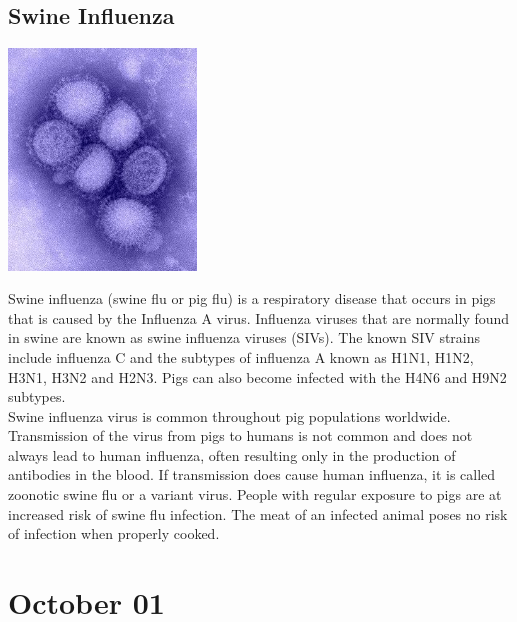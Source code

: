 \documentclass[11pt]{report}
\begin{document}
\subsection{Swine Influenza}
\vspace{2mm}\begin{center}\includegraphics[width=5cm]{./img/h1N1.jpg}\end{center}
Swine influenza (swine flu or pig flu) is a respiratory disease that occurs in pigs that is caused by the Influenza A virus. Influenza viruses that are normally found in swine are known as swine influenza viruses (SIVs). The known SIV strains include influenza C and the subtypes of influenza A known as H1N1, H1N2, H3N1, H3N2 and H2N3. Pigs can also become infected with the H4N6 and H9N2 subtypes.\\
\indent Swine influenza virus is common throughout pig populations worldwide. Transmission of the virus from pigs to humans is not common and does not always lead to human influenza, often resulting only in the production of antibodies in the blood. If transmission does cause human influenza, it is called zoonotic swine flu or a variant virus. People with regular exposure to pigs are at increased risk of swine flu infection. The meat of an infected animal poses no risk of infection when properly cooked.
\section{October 01}
\end{document}
